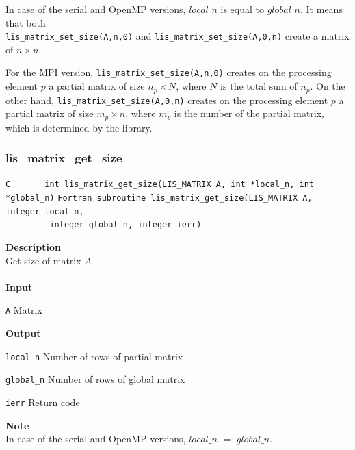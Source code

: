 \documentclass[a4paper]{article}
\newcommand{\namelistlabel}[1]{\mbox{#1}\hfill}
\newenvironment{namelist}[1]{%
 \begin{list}{}
  {\let\makelabel\namelistlabel
  \settowidth{\labelwidth}{#1}
  \setlength{\leftmargin}{1.1\labelwidth}}
}{%
\end{list}}
\begin{document}
In case of the serial and OpenMP versions, $local\_n$ is equal to $global\_n$. 
It means that both \\
\verb|lis_matrix_set_size(A,n,0)| and \verb|lis_matrix_set_size(A,0,n)|
create a matrix of $n \times n$.

For the MPI version, \verb|lis_matrix_set_size(A,n,0)| creates on the processing element $p$ 
a partial matrix of size $n_p \times N$, where $N$ is the total sum of $n_p$. 
On the other hand, \verb|lis_matrix_set_size(A,0,n)| creates 
on the processing element $p$ a partial matrix of size $m_p \times n$, where $m_p$ is the number of 
the partial matrix, which is determined by the library.
  \subsubsection{lis\_matrix\_get\_size}
\begin{screen}
\verb|C       int lis_matrix_get_size(LIS_MATRIX A, int *local_n, int *global_n)|
\verb|Fortran subroutine lis_matrix_get_size(LIS_MATRIX A, integer local_n,|\\
\verb|         integer global_n, integer ierr)|
\end{screen}
{\bf Description}\\
\indent
Get size of matrix $A$
\\ \\
\noindent
{\bf Input}
\begin{namelist}{XXXXXXXXXXXXXXXXXXXX}
\item[\tt A] Matrix
\end{namelist}
{\bf Output}
\begin{namelist}{XXXXXXXXXXXXXXXXXXXX}
\item[\tt local\_n] Number of rows of partial matrix
\item[\tt global\_n] Number of rows of global matrix
\item[\tt ierr] Return code
\end{namelist}
{\bf Note}\\
\indent
In case of the serial and OpenMP versions, $local\_n$ $=$ $global\_n$. 
\end{document}
